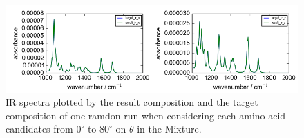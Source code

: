 
\begin{figure}[!ht] 
\centering
\includegraphics[scale=0.7]{Figures/chapter5_result_target_residual_plotting__ir_result8_run1.png}
\caption{IR spectra plotted by the result composition and the target composition of one ramdon run when considering each amino acid candidates from $0^{\circ}$ to $80^{\circ}$ on $\theta$ in the Mixture.} \label{fig:5.2}
\end{figure}

